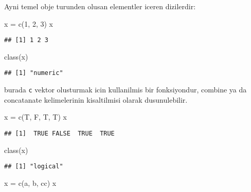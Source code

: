 \documentclass[
]{book}
\newenvironment{Shaded}{\begin{snugshade}}{\end{snugshade}}
\newcommand{\DecValTok}[1]{\textcolor[rgb]{0.00,0.00,0.81}{#1}}
\newcommand{\FunctionTok}[1]{\textcolor[rgb]{0.00,0.00,0.00}{#1}}
\newcommand{\NormalTok}[1]{#1}
\newcommand{\OtherTok}[1]{\textcolor[rgb]{0.56,0.35,0.01}{#1}}
\newcommand{\StringTok}[1]{\textcolor[rgb]{0.31,0.60,0.02}{#1}}
\begin{document}
Ayni temel obje turunden olusan elementler iceren dizilerdir:

\begin{Shaded}
\begin{Highlighting}[]
\NormalTok{x }\OtherTok{=} \FunctionTok{c}\NormalTok{(}\DecValTok{1}\NormalTok{, }\DecValTok{2}\NormalTok{, }\DecValTok{3}\NormalTok{)}
\NormalTok{x}
\end{Highlighting}
\end{Shaded}

\begin{verbatim}
## [1] 1 2 3
\end{verbatim}

\begin{Shaded}
\begin{Highlighting}[]
\FunctionTok{class}\NormalTok{(x)}
\end{Highlighting}
\end{Shaded}

\begin{verbatim}
## [1] "numeric"
\end{verbatim}

burada \texttt{c} vektor olusturmak icin kullanilmis bir fonksiyondur, combine ya da concatanate kelimelerinin kisaltilmisi olarak dusunulebilir.

\begin{Shaded}
\begin{Highlighting}[]
\NormalTok{x }\OtherTok{=} \FunctionTok{c}\NormalTok{(T, F, T, T)}
\NormalTok{x}
\end{Highlighting}
\end{Shaded}

\begin{verbatim}
## [1]  TRUE FALSE  TRUE  TRUE
\end{verbatim}

\begin{Shaded}
\begin{Highlighting}[]
\FunctionTok{class}\NormalTok{(x)}
\end{Highlighting}
\end{Shaded}

\begin{verbatim}
## [1] "logical"
\end{verbatim}

\begin{Shaded}
\begin{Highlighting}[]
\NormalTok{x }\OtherTok{=} \FunctionTok{c}\NormalTok{(}\StringTok{\textquotesingle{}a\textquotesingle{}}\NormalTok{, }\StringTok{\textquotesingle{}b\textquotesingle{}}\NormalTok{, }\StringTok{\textquotesingle{}cc\textquotesingle{}}\NormalTok{)}
\NormalTok{x}
\end{Highlighting}
\end{Shaded}
\end{document}
